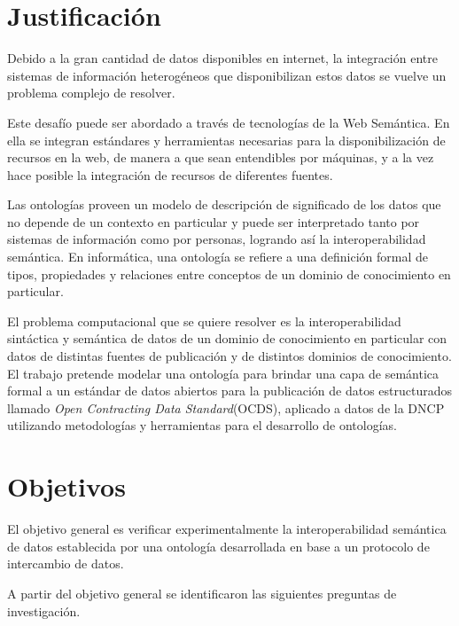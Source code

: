 \section{Justificación}

Debido a la gran cantidad de datos disponibles en internet, la integración entre sistemas de información heterogéneos que disponibilizan estos datos se vuelve un problema complejo de resolver. 

Este desafío puede ser abordado a través de tecnologías de la Web Semántica. En ella se integran estándares y herramientas necesarias para la disponibilización de recursos en la web, de manera a que sean entendibles por máquinas, y a la vez hace posible la integración de recursos de diferentes fuentes. 

Las ontologías proveen un modelo de descripción de significado de los datos que no depende de un contexto en particular y puede ser interpretado tanto por sistemas de información como por personas, logrando así la interoperabilidad semántica. En informática, una ontología se refiere a una definición formal de tipos, propiedades y relaciones entre conceptos de un dominio de conocimiento en particular.

El problema computacional que se quiere resolver es la interoperabilidad sintáctica y semántica de datos de un dominio de conocimiento en particular con datos de distintas fuentes de publicación y de distintos dominios de conocimiento. El trabajo pretende modelar una ontología para brindar una capa de semántica formal a un estándar de datos abiertos para la publicación de datos estructurados llamado \textit{Open Contracting Data Standard}(OCDS), aplicado a datos de la DNCP utilizando metodologías y herramientas para el desarrollo de ontologías. 


\section{Objetivos}

El objetivo general es verificar experimentalmente la interoperabilidad semántica de datos establecida por una ontología desarrollada en base a un protocolo de intercambio de datos.

A partir del objetivo general se identificaron las siguientes preguntas de investigación.

